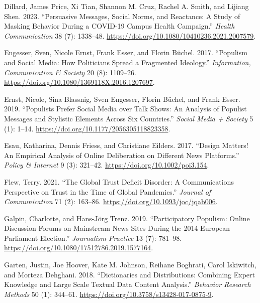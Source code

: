 \documentclass[
]{ccr}
\newlength{\cslhangindent}
\newlength{\cslentryspacingunit} %
\newenvironment{CSLReferences}[2] %
 {%
  \setlength{\parindent}{0pt}
  \ifodd #1
  \let\oldpar\par
  \def\par{\hangindent=\cslhangindent\oldpar}
  \fi
  \setlength{\parskip}{#2\cslentryspacingunit}
 }%
 {}
\begin{document}
\begin{CSLReferences}{1}{0}
\leavevmode{}%
Dillard, James Price, Xi Tian, Shannon M. Cruz, Rachel A. Smith, and
Lijiang Shen. 2023. {``Persuasive {Messages}, {Social Norms}, and
{Reactance}: {A Study} of {Masking Behavior} During a {COVID-19 Campus
Health Campaign}.''} \emph{Health Communication} 38 (7): 1338--48.
\url{https://doi.org/10.1080/10410236.2021.2007579}.

\leavevmode{}%
Engesser, Sven, Nicole Ernst, Frank Esser, and Florin Büchel. 2017.
{``Populism and Social Media: How Politicians Spread a Fragmented
Ideology.''} \emph{Information, Communication \& Society} 20 (8):
1109--26. \url{https://doi.org/10.1080/1369118X.2016.1207697}.

\leavevmode{}%
Ernst, Nicole, Sina Blassnig, Sven Engesser, Florin Büchel, and Frank
Esser. 2019. {``Populists Prefer Social Media over Talk Shows: {An}
Analysis of Populist Messages and Stylistic Elements Across Six
Countries.''} \emph{Social Media + Society} 5 (1): 1--14.
\url{https://doi.org/10.1177/2056305118823358}.

\leavevmode{}%
Esau, Katharina, Dennis Friess, and Christiane Eilders. 2017. {``Design
Matters! {An} Empirical Analysis of Online Deliberation on Different
News Platforms.''} \emph{Policy \& Internet} 9 (3): 321--42.
\url{https://doi.org/10.1002/poi3.154}.

\leavevmode{}%
Flew, Terry. 2021. {``The {Global Trust Deficit Disorder}: {A
Communications Perspective} on {Trust} in the {Time} of {Global
Pandemics}.''} \emph{Journal of Communication} 71 (2): 163--86.
\url{https://doi.org/10.1093/joc/jqab006}.

\leavevmode{}%
Galpin, Charlotte, and Hans-Jörg Trenz. 2019. {``Participatory Populism:
{Online} Discussion Forums on Mainstream News Sites During the 2014
{European Parliament} Election.''} \emph{Journalism Practice} 13 (7):
781--98. \url{https://doi.org/10.1080/17512786.2019.1577164}.

\leavevmode{}%
Garten, Justin, Joe Hoover, Kate M. Johnson, Reihane Boghrati, Carol
Iskiwitch, and Morteza Dehghani. 2018. {``Dictionaries and
Distributions: {Combining} Expert Knowledge and Large Scale Textual Data
Content Analysis.''} \emph{Behavior Research Methods} 50 (1): 344--61.
\url{https://doi.org/10.3758/s13428-017-0875-9}.


\end{CSLReferences}
\end{document}
